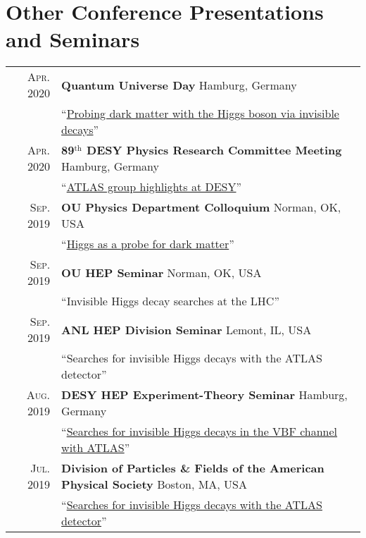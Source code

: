 \documentclass[a4paper,10pt]{article}
\begin{document}
\section{Other Conference Presentations and Seminars}
\begin{tabular}{rp{15.5cm}}
\textsc{Apr. 2020}		& {\bf Quantum Universe Day} \hfill Hamburg, Germany\\
						& ``\href{https://indico.desy.de/indico/event/23731/session/0/contribution/1}{Probing dark matter with the Higgs boson via invisible decays}''  	\\
\textsc{Apr. 2020}		& {\bf 89$^{\mathrm{th}}$ DESY Physics Research Committee Meeting} \hfill Hamburg, Germany\\
						& ``\href{https://indico.desy.de/indico/event/25538/}{ATLAS group highlights at DESY}''  	\\
\textsc{Sep. 2019}		& {\bf OU Physics Department Colloquium} \hfill Norman, OK, USA\\
						& ``\href{https://www.nhn.ou.edu/news-and-events/events/colloquium224}{Higgs as a probe for dark matter}''  	\\
\textsc{Sep. 2019}		& {\bf OU HEP Seminar} \hfill Norman, OK, USA\\
						& ``Invisible Higgs decay searches at the LHC''  	\\
\textsc{Sep. 2019}		& {\bf ANL HEP Division Seminar} \hfill Lemont, IL, USA \\
						& ``Searches for invisible Higgs decays with the ATLAS detector''  	\\
\textsc{Aug. 2019}		& {\bf DESY HEP Experiment-Theory Seminar} \hfill Hamburg, Germany\\
						& ``\href{https://indico.desy.de/indico/event/23856/}{Searches for invisible Higgs decays in the VBF channel with ATLAS}''  	\\
\textsc{Jul. 2019}		& {\bf Division of Particles \& Fields of the American Physical Society} \hfill Boston, MA, USA \\
						& ``\href{https://indico.cern.ch/event/782953/contributions/3455052/}{Searches for invisible Higgs decays with the ATLAS detector}''  	\\


\end{tabular}
\end{document}
